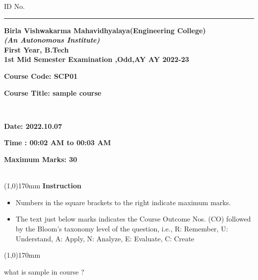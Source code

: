 \documentclass[addpoints,12pt]{exam}
\begin{document}
    \hspace{-7mm}ID No.\rule{20mm}{0.3mm}
    \begin{center}
 \textbf{Birla Vishwakarma Mahavidhyalaya(Engineering College)} \\
  \textbf{\textit{(An Autonomous Institute)}} \\
  \textbf{First Year, B.Tech} \\
  \textbf{1st Mid Semester Examination ,Odd,AY AY 2022-23} \\
  \vspace{4mm}
 
 
  \end{center}
 
  \hspace{-7mm}
  \parbox[t]{50mm}{\textbf{Course Code: SCP01}}
  \parbox[t]{100mm}{\textbf{Course Title: sample course}}\vspace{2mm}\\
  \parbox[t]{50mm}{\textbf{Date: 2022.10.07}}
  \parbox[t]{75mm}{\textbf{Time : 00:02 AM to 00:03 AM}}
  \parbox[t]{50mm}{\textbf{Maximum Marks: 30}}\\
  \line(1,0){170mm} \vspace{2mm}
  \hspace{-6mm}\textbf{Instruction}

 

  \begin{itemize}[leftmargin=4mm,rightmargin=-2cm]
      \item Numbers in the square brackets to the right indicate maximum marks.
     
      \item The text just below marks indicates the Course Outcome Nos. (CO) followed by the Bloom’s taxonomy level of the question, i.e., R: Remember, U: Understand, A: Apply, N: Analyze, E: Evaluate, C: Create
  \end{itemize}
  \line(1,0){170mm}
 \vspace{5mm}
\begin{questions}
\pointname{}
\pointsinrightmargin
{}\question[2]
what is sample in course ?
\end{questions}
\end{document}

